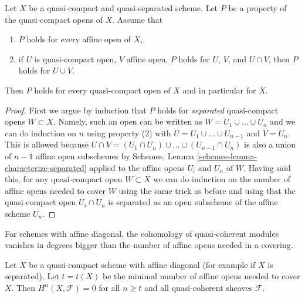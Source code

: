 \begin{lemma}
\label{lemma-induction-principle}
Let $X$ be a quasi-compact and quasi-separated scheme. Let $P$ be a property
of the quasi-compact opens of $X$. Assume that
\begin{enumerate}
\item $P$ holds for every affine open of $X$,
\item if $U$ is quasi-compact open, $V$ affine open,
$P$ holds for $U$, $V$, and $U \cap V$, then
$P$ holds for $U \cup V$.
\end{enumerate}
Then $P$ holds for every quasi-compact open of $X$
and in particular for $X$.
\end{lemma}

\begin{proof}
First we argue by induction that $P$ holds for {\it separated} quasi-compact
opens $W \subset X$. Namely, such an open can be written as
$W = U_1 \cup \ldots \cup U_n$ and we can do induction on $n$ using
property (2) with $U = U_1 \cup \ldots \cup U_{n - 1}$ and $V = U_n$.
This is allowed because
$U \cap V = (U_1 \cap U_n) \cup \ldots \cup (U_{n - 1} \cap U_n)$
is also a union of $n - 1$ affine open subschemes by
Schemes, Lemma \ref{schemes-lemma-characterize-separated}
applied to the affine opens $U_i$ and $U_n$ of $W$.
Having said this, for any quasi-compact open $W \subset X$ we can
do induction on the number of affine opens needed to cover $W$
using the same trick as before and using that the quasi-compact open
$U_i \cap U_n$ is separated as an open subscheme of the affine scheme $U_n$.
\end{proof}

\begin{lemma}
\label{lemma-vanishing-nr-affines}
\begin{slogan}
For schemes with affine diagonal, the cohomology of quasi-coherent
modules vanishes in degrees bigger than the number of affine
opens needed in a covering.
\end{slogan}
Let $X$ be a quasi-compact scheme with affine diagonal (for example
if $X$ is separated).
Let $t = t(X)$ be the minimal number of affine opens needed to
cover $X$. Then $H^n(X, \mathcal{F}) = 0$ for all $n \geq t$ and all
quasi-coherent sheaves $\mathcal{F}$.
\end{lemma}

